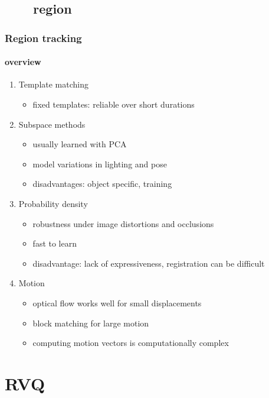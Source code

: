 \subsection{\ \ \ \ region}
\begin{frame}
\frametitle{Region tracking}
\framesubtitle{overview}
\logoCSIPCPL\mypagenum
	\begin{enumerate}
		\item Template matching
			\begin{itemize}
				\item fixed templates: reliable over short durations 
			\end{itemize}
		\item Subspace methods
			\begin{itemize}
				\item usually learned with PCA
				\item model variations in lighting and pose
				\item disadvantages: object specific, training
			\end{itemize}			
		\item Probability density
			\begin{itemize}
				\item robustness under image distortions and occlusions
				\item fast to learn
				\item disadvantage: lack of expressiveness, registration can be difficult
			\end{itemize}
		\item Motion
			\begin{itemize}
				\item optical flow works well for small displacements
				\item block matching for large motion
				\item computing motion vectors is computationally complex
			\end{itemize}
	\end{enumerate}
\end{frame}


\section{RVQ}
